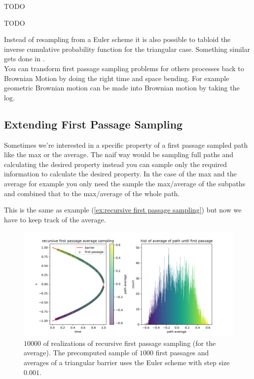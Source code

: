 \documentclass[a4paper,12pt]{article}
\begin{document}
\begin{pythonn}
    TODO
\end{pythonn}

\begin{pythonn}
    TODO
\end{pythonn}

Instead of resampling from a Euler scheme it is also possible
to tabloid the inverse cumulative probability function for the
triangular case. Something similar gets done in \cite{hwang_simulationtabulation_2001}. \\


You can transform first passage sampling problems for others processes back to
Brownian Motion by doing the right time and space bending. For example geometric
Brownian motion can be made into Brownian motion by taking the log. \\


\subsection{Extending First Passage Sampling}

Sometimes we're interested in a specific property of a first passage sampled
path like the max or the average. The naif way would be sampling full paths
and calculating the desired property instead you can sample only the required
information to calculate the desired property. In the case of the max
and the average for example you only need the sample the max/average
of the subpaths and combined that to the max/average of the whole path.\\


\begin{example}
    This is the same as example (\ref{ex:recursive first passage sampling}) but now we have
    to keep track of the average.

    \begin{figure}[ht!]
        \centering
        \includegraphics[width=1\textwidth]{plots/recursive first passage average para.png}
        \caption{ $10000$ of realizations of recursive first passage sampling (for the average).
            The precomputed sample of $1000$ first passages and averages of a triangular barrier
            uses the Euler scheme with step size $0.001$.}
        \label{fig:recursive first passage average para}
    \end{figure}
\end{example}
\end{document}

